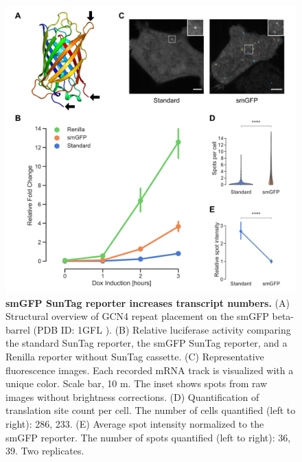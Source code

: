 \begin{figure}[h]
    \centering
    \includegraphics[width=\linewidth]{images/figure6}
    \caption{\textbf{smGFP SunTag reporter increases transcript numbers.}
        (A) Structural overview of GCN4 repeat placement on the smGFP beta-barrel (PDB ID: 1GFL \cite{yang_molecular_1996}).
        (B) Relative luciferase activity comparing the standard SunTag reporter,
            the smGFP SunTag reporter, and a Renilla reporter without SunTag cassette.
        (C) Representative fluorescence images. Each recorded mRNA track is 
            visualized with a unique color. Scale bar, 10 \textmu m.
            The inset shows spots from raw images without brightness corrections.
        (D) Quantification of translation site count per cell.
            The number of cells quantified (left to right): 286, 233.
        (E) Average spot intensity normalized to the smGFP reporter.
            The number of spots quantified (left to right): 36, 39. Two replicates.
    }
    \label{fig:spaghetti}
\end{figure}